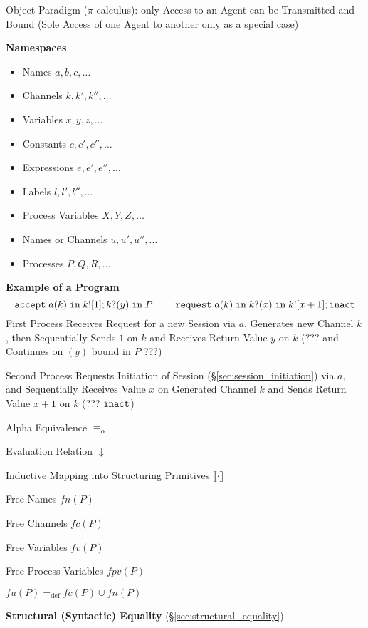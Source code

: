 Object Paradigm ($\pi$-calculus): only Access to an Agent can be
Transmitted and Bound (Sole Access of one Agent to another only as a
special case)



\textbf{Namespaces} \cite{honda-vasconcelos-kubo98}

\begin{itemize}
\item Names $a,b,c,\ldots$
\item Channels $k,k',k'',\ldots$
\item Variables $x,y,z,\ldots$
\item Constants $c,c',c'',\ldots$
\item Expressions $e,e',e'',\ldots$
\item Labels $l,l',l'',\ldots$
\item Process Variables $X,Y,Z,\ldots$
\item Names or Channels $u, u', u'', \ldots$
\item Processes $P,Q,R, \ldots$
\end{itemize}


\textbf{Example of a Program} \cite{honda-vasconcelos-kubo98}
\[
  \mathtt{accept} \; a(k) \; \mathtt{in} \; k![1];
  k?(y) \; \mathtt{in} \; P
  \quad | \quad
  \mathtt{request} \; a(k) \; \mathtt{in} \; k?(x)
  \; \mathtt{in} \; k![x+1]; \mathtt{inact}
\]
First Process Receives Request for a new Session via $a$, Generates
new Channel $k$, then Sequentially Sends $1$ on $k$ and Receives
Return Value $y$ on $k$ (??? and Continues on $(y)$ bound in $P$ ???)

Second Process Requests Initiation of Session
(\S\ref{sec:session_initiation}) via $a$, and Sequentially Receives
Value $x$ on Generated Channel $k$ and Sends Return Value $x + 1$ on
$k$ (??? $\mathtt{inact}$)

Alpha Equivalence $\equiv_\alpha$

Evaluation Relation $\downarrow$

Inductive Mapping into Structuring Primitives $\llbracket \cdot
\rrbracket$

Free Names $fn(P)$

Free Channels $fc(P)$

Free Variables $fv(P)$

Free Process Variables $fpv(P)$

$fu(P) =_{\text{def}} fc(P) \cup fn(P)$


\textbf{Structural (Syntactic) Equality}
(\S\ref{sec:structural_equality})
\cite{honda-vasconcelos-kubo98}

